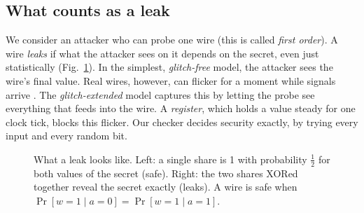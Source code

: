 \documentclass[conference]{IEEEtran}
\begin{document}
\subsection{What counts as a leak}
We consider an attacker who can probe one wire (this is called \emph{first order}). A wire \emph{leaks} if what the attacker sees on it depends on the secret, even just statistically (Fig.~\ref{fig:probing}). In the simplest, \emph{glitch-free} model, the attacker sees the wire's final value. Real wires, however, can flicker for a moment while signals arrive \cite{mangard2005glitch}. The \emph{glitch-extended} model \cite{faust2018robust} captures this by letting the probe see everything that feeds into the wire. A \emph{register}, which holds a value steady for one clock tick, blocks this flicker. Our checker decides security exactly, by trying every input and every random bit.

\begin{figure}[!t]
\centering
{}
\caption{What a leak looks like. Left: a single share is 1 with probability $\tfrac12$ for both values of the secret (safe). Right: the two shares XORed together reveal the secret exactly (leaks). A wire is safe when $\Pr[w=1\mid a=0]=\Pr[w=1\mid a=1]$.}\label{fig:probing}
\end{figure}
\end{document}

